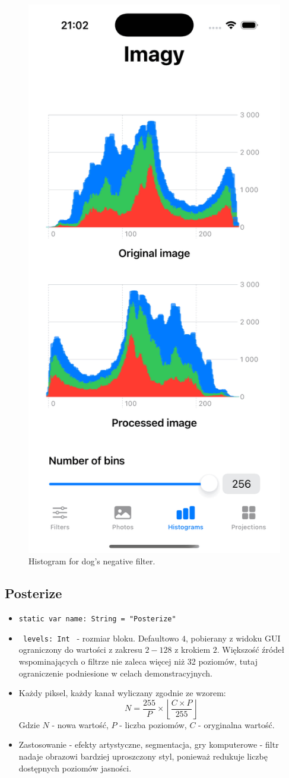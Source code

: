\documentclass[a4paper]{article}
\begin{document}
\begin{figure}[H]
    \centering
    \includegraphics[width=0.25\linewidth]{images/dog_negative_histogram.png}
    \caption{Histogram for dog's negative filter.}
    \label{fig:dog_negative_histogram}
\end{figure}

\subsection{Posterize}

\begin{itemize}
    \item \texttt{static var name: String = "Posterize"}
    \item \texttt{ levels: Int } - rozmiar bloku. Defaultowo $4$, pobierany z widoku GUI ograniczony do wartości z zakresu $2-128$ z krokiem $2$. Większość źródeł wspominających o filtrze nie zaleca więcej niż 32 poziomów, tutaj ograniczenie podniesione w celach demonstracyjnych.
    \item Każdy piksel, każdy kanał wyliczany zgodnie ze wzorem:
          $$
              N = \frac{255}{P} \times \left\lfloor \frac{C \times P}{255} \right\rfloor
          $$
          Gdzie $N$ - nowa wartość, $P$ - liczba poziomów, $C$ - oryginalna wartość.
    \item Zastosowanie - efekty artystyczne, segmentacja, gry komputerowe - filtr nadaje obrazowi bardziej uproszczony styl, ponieważ redukuje liczbę dostępnych poziomów jasności.
\end{itemize}
\end{document}
